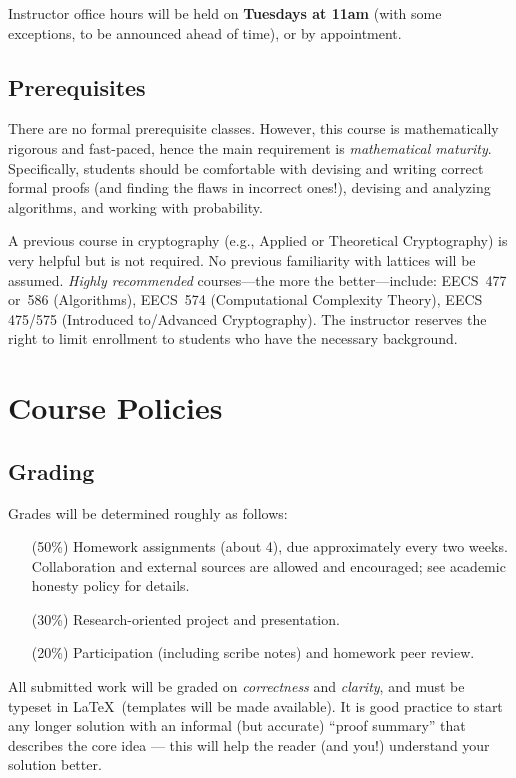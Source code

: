 \documentclass[11pt]{article}
\begin{document}
Instructor office hours will be held on \textbf{Tuesdays at 11am}
(with some exceptions, to be announced ahead of time), or by
appointment.

\subsection{Prerequisites}
\label{sec:prerequisites}

There are no formal prerequisite classes.  However, this course is
mathematically rigorous and fast-paced, hence the main requirement is
\emph{mathematical maturity}.  Specifically, students should be
comfortable with devising and writing correct formal proofs (and
finding the flaws in incorrect ones!), devising and analyzing
algorithms, and working with probability.

A previous course in cryptography (e.g., Applied or Theoretical
Cryptography) is very helpful but is not required.  No previous
familiarity with lattices will be assumed.  \emph{Highly recommended}
courses---the more the better---include: EECS~477 or~586 (Algorithms),
EECS~574 (Computational Complexity Theory), EECS 475/575 (Introduced
to/Advanced Cryptography).  The instructor reserves the right to limit
enrollment to students who have the necessary background.

\section{Course Policies}
\label{sec:policies}

\subsection{Grading}
\label{sec:grading}

Grades will be determined roughly as follows:
\begin{itemize}
\item[(50\%)] Homework assignments (about 4), due approximately every
  two weeks.  Collaboration and external sources are allowed and
  encouraged; see academic honesty policy for details.

\item[(30\%)] Research-oriented project and presentation.

\item[(20\%)] Participation (including scribe notes) and homework peer
  review.
\end{itemize}

All submitted work will be graded on \emph{correctness} and
\emph{clarity}, and must be typeset in \LaTeX\ (templates will be made
available).  It is good practice to start any longer solution with an
informal (but accurate) ``proof summary'' that describes the core idea
--- this will help the reader (and you!)  understand your solution
better.
\end{document}
